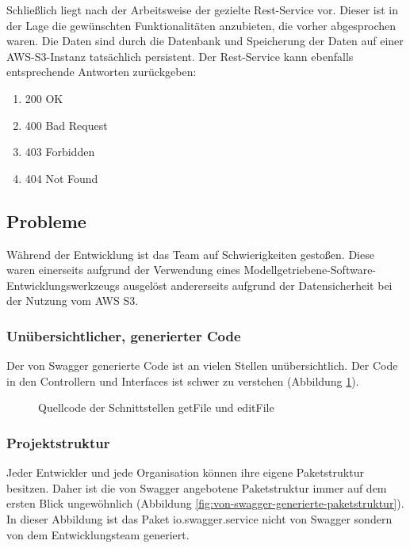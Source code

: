 \documentclass[a4paper,twoside]{article}
\begin{document}
	Schlie\ss{}lich liegt nach der Arbeitsweise der gezielte Rest-Service vor. Dieser ist in der Lage die gew\"unschten Funktionalit\"aten anzubieten, die vorher abgesprochen waren. Die Daten sind durch die Datenbank und Speicherung der Daten auf einer AWS-S3-Instanz tats\"achlich persistent. Der Rest-Service kann ebenfalls entsprechende Antworten zur\"uckgeben:
	\begin{enumerate}
		\item 200 OK
		\item 400 Bad Request
		\item 403 Forbidden
		\item 404 Not Found
	\end{enumerate}
	
	\subsection{Probleme}
	
	W\"ahrend der Entwicklung ist das Team auf Schwierigkeiten gesto\ss{}en. Diese waren einerseits aufgrund der Verwendung eines Modellgetriebene-Software-Entwicklungswerkzeugs ausgel\"ost andererseits aufgrund der Datensicherheit bei der Nutzung vom AWS S3.
	
	\subsubsection{Un\"ubersichtlicher, generierter Code}
	
	Der von Swagger generierte Code ist an vielen Stellen un\"ubersichtlich. Der Code in den Controllern und Interfaces ist schwer zu verstehen  (Abbildung \ref{fig:quellcode-der-schnittstellen-getFile-und-editFile}). 
	
	\begin{figure}[ht]
		\centering
		{}
		\caption{Quellcode der Schnittstellen getFile und editFile}
		\label{fig:quellcode-der-schnittstellen-getFile-und-editFile}
	\end{figure}
	
	\subsubsection{Projektstruktur}
	
	Jeder Entwickler und jede Organisation können ihre eigene Paketstruktur besitzen. Daher ist die von Swagger angebotene Paketstruktur immer auf dem ersten Blick ungew\"ohnlich (Abbildung \ref{fig:von-swagger-generierte-paketstruktur}). In dieser Abbildung ist das Paket io.swagger.service nicht von Swagger sondern von dem Entwicklungsteam generiert.
	
\end{document}
